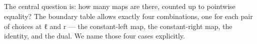 \documentclass[11pt,a4paper]{book}
\def\texttt#1{#1}%
\begin{document}
\begin{code}
\AgdaSpace{}%
\AgdaSpace{}%
\AgdaSpace{}%
\AgdaSymbol{(}\AgdaSpace{}%
\AgdaSymbol{)}\<%
\\
%
\>[4]\AgdaSpace{}%
\AgdaSymbol{|}\AgdaSpace{}%
\AgdaSpace{}%
\AgdaSpace{}%
\AgdaSymbol{=}\AgdaSpace{}%
\AgdaSpace{}%
\AgdaSymbol{((}\AgdaSpace{}%
\AgdaSymbol{)}\AgdaSpace{}%
\AgdaSymbol{(}\AgdaSpace{}%
\AgdaSymbol{))}\<%
\\
%
\>[4]\AgdaSpace{}%
\AgdaSymbol{|}\AgdaSpace{}%
\AgdaSpace{}%
\AgdaSymbol{\AgdaUnderscore{}}\AgdaSpace{}%
\AgdaSpace{}%
\AgdaSpace{}%
\AgdaSpace{}%
\AgdaSymbol{(}\AgdaSpace{}%
\AgdaSymbol{)}\<%
\\
%
\>[4]\AgdaSpace{}%
\AgdaSymbol{|}\AgdaSpace{}%
\AgdaSpace{}%
\AgdaSpace{}%
\AgdaSymbol{=}\AgdaSpace{}%
\AgdaSpace{}%
\AgdaSymbol{((}\AgdaSpace{}%
\AgdaSymbol{)}\AgdaSpace{}%
\AgdaSymbol{)}\<%
\\
%
\>[4]\AgdaSpace{}%
\AgdaSymbol{|}\AgdaSpace{}%
\AgdaSpace{}%
\AgdaSymbol{\AgdaUnderscore{}}%
\>[19]\AgdaSymbol{=}\AgdaSpace{}%
\<%
\end{code}

The central question is: how many maps are there, counted up to pointwise
equality? The boundary table allows exactly four combinations, one for each
pair of choices at \texttt{ℓ} and \texttt{r} --- the constant-left map,
the constant-right map, the identity, and the dual. We name those four
cases explicitly.

\begin{code}%
\>[0]\AgdaSpace{}%
\AgdaSpace{}%
\AgdaSymbol{:}\AgdaSpace{}%
\AgdaSpace{}%
\<%
\\
\>[0][@{}l@{\AgdaIndent{0}}]%
\>[2]\AgdaSpace{}%
\AgdaSymbol{:}\AgdaSpace{}%
\<%
\\
%
\>[2]\AgdaSpace{}%
\AgdaSymbol{:}\AgdaSpace{}%
\<%
\\
%
\>[2]%
\>[14]\AgdaSymbol{:}\AgdaSpace{}%
\<%
\\
%
\>[2]%
\>[14]\AgdaSymbol{:}\AgdaSpace{}%
\<%
\end{code}
\end{document}
